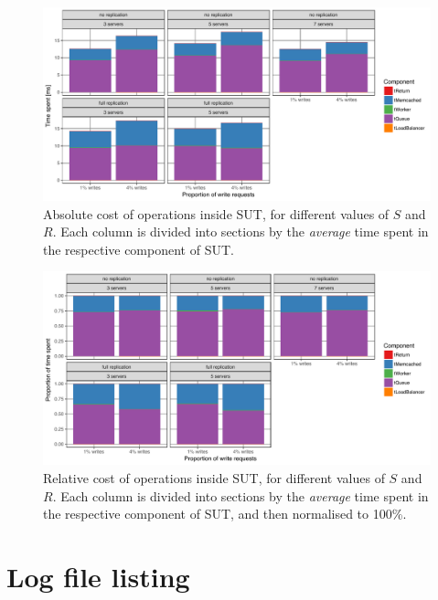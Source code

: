 \documentclass[11pt]{article}
\begin{document}
\begin{figure}[h]
\centering
\includegraphics[width=\textwidth]{../results/writes/graphs/time_breakdown_vs_writes_set_abs.pdf}
\caption{Absolute cost of operations inside SUT, for different values of $S$ and $R$. Each column is divided into sections by the \emph{average} time spent in the respective component of SUT.}
\label{fig:exp3:res:breakdown:set:abs}
\end{figure}

\begin{figure}[h]
\centering
\includegraphics[width=\textwidth]{../results/writes/graphs/time_breakdown_vs_writes_set_rel.pdf}
\caption{Relative cost of operations inside SUT, for different values of $S$ and $R$. Each column is divided into sections by the \emph{average} time spent in the respective component of SUT, and then normalised to 100\%.}
\label{fig:exp3:res:breakdown:set:rel}
\end{figure}


\clearpage

\section*{Log file listing}
\end{document}
